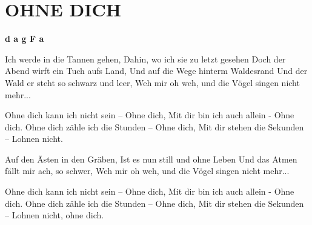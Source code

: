 \documentclass[../../../songbook.tex]{subfiles}
\begin{document}
\TabPositions{9cm} %
\section*{OHNE DICH}
{}
\vspace{0.5cm}
{\color{red}\textbf{d a g F a} } \newline

Ich werde in die Tannen gehen, \newline
Dahin, wo ich sie zu letzt gesehen \newline
Doch der Abend wirft ein Tuch aufs Land, \newline
Und auf die Wege hinterm Waldesrand \newline
Und der Wald er steht so schwarz und leer, \newline
Weh mir oh weh,   und die Vögel singen nicht mehr... \newline

\-\hspace{1cm} Ohne dich kann ich nicht sein – Ohne dich, \newline
\-\hspace{1cm} Mit dir bin ich auch allein - Ohne dich. \newline
\-\hspace{1cm} Ohne dich zähle ich die Stunden – Ohne dich, \newline
\-\hspace{1cm} Mit dir stehen die Sekunden – Lohnen nicht. \newline

Auf den Ästen in den Gräben, \newline
Ist es nun still und ohne Leben \newline
Und das Atmen fällt mir ach, so schwer, \newline
Weh mir oh weh,   und die Vögel singen nicht mehr... \newline

\-\hspace{1cm} Ohne dich kann ich nicht sein – Ohne dich, \newline
\-\hspace{1cm} Mit dir bin ich auch allein - Ohne dich. \newline
\-\hspace{1cm} Ohne dich zähle ich die Stunden – Ohne dich, \newline
\-\hspace{1cm} Mit dir stehen die Sekunden – Lohnen nicht, ohne dich. \newline
 
\end{document}
